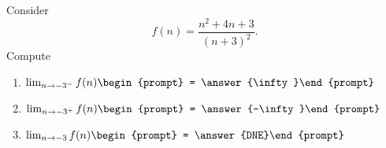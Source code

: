 \documentclass{ximera}
\author{Bart Snapp}
\begin{document}
\begin{exercise}
Consider 
\[
f(n) = \frac{n^2+4 n+3}{(n+3)^2}.
\]
Compute
\begin{enumerate}
\item $\lim_{n\to -3^- } f(n) \begin{prompt} = \answer{\infty}\end{prompt}$
\item $\lim_{n\to -3^+ } f(n) \begin{prompt} = \answer{-\infty}\end{prompt}$
\item $\lim_{n\to -3 } f(n) \begin{prompt} = \answer{DNE}\end{prompt}$
\end{enumerate}
\end{exercise}
\end{document}
